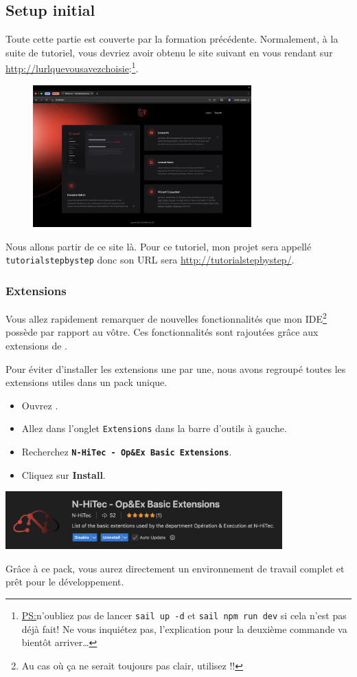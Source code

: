 \subsection{Setup initial}

Toute cette partie est couverte par la formation précédente. Normalement, à la suite de tutoriel, vous devriez avoir obtenu le site suivant en vous rendant sur \url{http://lurlquevousavezchoisie}:\footnote{\underline{PS:}n'oubliez pas de lancer \verb|sail up -d| et \verb|sail npm run dev| si cela n'est pas déjà fait! Ne vous inquiétez pas, l'explication pour la deuxième commande va bientôt arriver\ldots}.

\begin{figure}[!h]
    \centering
    \includegraphics[width=0.75\textwidth]{figures-C1/laravel_default_website.png}
\end{figure}

Nous allons partir de ce site là. Pour ce tutoriel, mon projet sera appellé \texttt{tutorialstepbystep} donc son URL sera \url{http://tutorialstepbystep/}.

\newpage
\subsubsection[Extensions]{Extensions}

Vous allez rapidement remarquer de nouvelles fonctionnalités que mon IDE\footnote{Au cas où ça ne serait toujours pas clair, utilisez \vscode{} !!} possède par rapport au vôtre. Ces fonctionnalités sont rajoutées grâce aux extensions de \vscode{}. 

Pour éviter d’installer les extensions une par une, nous avons regroupé toutes les extensions utiles dans un pack unique.  

\begin{itemize}
    \item Ouvrez \vscode{}.
    \item Allez dans l’onglet \verb|Extensions| dans la barre d’outils à gauche.
    \item Recherchez \textbf{\texttt{N-HiTec - Op\&Ex Basic Extensions}}.
    \item Cliquez sur \textbf{Install}.
\end{itemize}

\begin{center}
    \includegraphics[width=0.8\textwidth]{figures-C1/nhitecpack.png}
\end{center}

Grâce à ce pack, vous aurez directement un environnement de travail complet et prêt pour le développement.